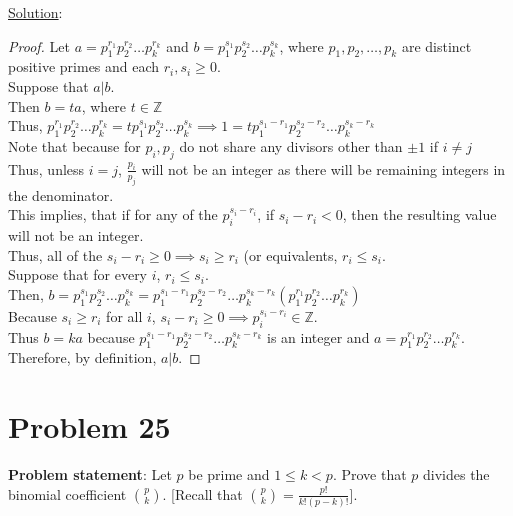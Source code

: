 \documentclass{article} %
\begin{document}
\underline{Solution}: 
\begin{addmargin}[1em]{0em}
\begin{proof}
Let $a = p_1^{r_1}p_2^{r_2} \ldots p_k^{r_k}$ and $b = p_1^{s_1}p_2^{s_2} \ldots p_k^{s_k}$, where $p_1,p_2,\ldots,p_k$ are distinct positive primes and each $r_i,s_i \geq 0$.
\\ \marginpar{$\Rightarrow$}
Suppose that $a|b$.
\\Then $b = ta$, where $t \in \mathbb{Z}$
\\Thus, $p_1^{r_1}p_2^{r_2} \ldots p_k^{r_k} = tp_1^{s_1}p_2^{s_2} \ldots p_k^{s_k} \implies 1 = tp_1^{s_1 - r_1}p_2^{s_2-r_2} \ldots p_k^{s_k-r_k}$
\\Note that because for $p_i, p_j$ do not share any divisors other than $\pm 1$ if $i \neq j$
\\Thus, unless $i = j$, $\frac{p_i}{p_j}$ will not be an integer as there will be remaining integers in the denominator.
\\This implies, that if for any of the $p_i^{s_i - r_i}$, if $s_i - r_i < 0$, then the resulting value will not be an integer.
\\Thus, all of the $s_i - r_i \geq 0 \implies s_i \geq r_i$ (or equivalents, $r_i \leq s_i$.
\\ \marginpar{$\Leftarrow$}
Suppose that for every $i$, $r_i \leq s_i$.
\\Then, $b = p_1^{s_1}p_2^{s_2} \ldots p_k^{s_k} = p_1^{s_1 - r_1}p_2^{s_2 - r_2} \ldots p_k^{s_k - r_k} (p_1^{r_1}p_2^{r_2} \ldots p_k^{r_k})$
\\Because $s_i \geq r_i$ for all $i$, $s_i - r_i \geq 0 \implies p_i^{s_i - r_i} \in \mathbb{Z}$.
\\Thus $b = ka$ because $p_1^{s_1 - r_1}p_2^{s_2 - r_2} \ldots p_k^{s_k - r_k}$ is an integer and $a = p_1^{r_1}p_2^{r_2} \ldots p_k^{r_k}$.
\\Therefore, by definition, $a|b$.
\end{proof}
\end{addmargin}

\newpage

\section*{Problem 25}


\textbf{Problem statement}: Let $p$ be prime and $1 \leq k < p$.  Prove that $p$ divides the binomial coefficient $\binom{p}{k}$.  [Recall that $\binom{p}{k} = \frac{p!}{k!(p-k)!}$].
\\
\end{document}
